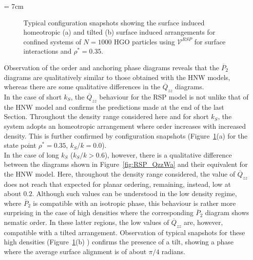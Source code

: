 \picW = 7cm
\begin{figure}
	\centering
	\caption{Typical configuration snapshots showing the surface induced homeotropic (a) and 
	tilted (b)  surface induced arrangements for confined systems of $N=1000$ HGO particles 
	using $\mathcal{V}^{RSP}$ for surface interactions and $\rho^{*} = 0.35$.}
	\label{fig:RSP_snaps}
\end{figure}

Observation of the order and anchoring phase diagrams reveals that the $\overline{P}_2$ diagrams 
are qualitatively
similar to those obtained with the HNW models, whereas there are some  qualitative 
differences in the $\overline{Q}_{zz}$ diagrams.\\
In the case of short $k_S$, the $\overline{Q}_{zz}$ behaviour for the RSP model 
is not unlike that of the HNW model and confirms the predictions made at the end of the  
last Section. Throughout the
density range considered here and for short $k_S$, the system adopts an homeotropic arrangement
where order increases with increased density. This is further confirmed by 
configuration snapshots (\eg Figure~\ref{fig:RSP_snaps}(a) for the state point
$\rho^{*}=0.35$, $k_S/k=0.0$).\\
In the case of long $k_S$ (\ie $k_S/k>0.6$), however, there is a qualitative difference between 
the diagrams shown in  Figure~\ref{fig:RSP_QzzWa} and their equivalent for the HNW model. 
Here, throughout the density range considered, the value of $\overline{Q}_{zz}$ does not reach 
that expected for planar ordering, remaining, instead, low at about $0.2$. Although such
values can be understood in the low density regime, where $\overline{P}_2$ is compatible with
an isotropic phase, this behaviour is rather more surprising in the case of high densities
where the corresponding $\overline{P}_2$ diagram shows nematic order. In these latter regions, 
the low values of
$\overline{Q}_{zz}$ are, however, compatible with a tilted arrangement. 
Observation of typical snapshots for these high densities 
(\eg Figure~\ref{fig:RSP_snaps}(b) ) confirms the presence of a tilt, showing a
phase where the average surface alignment is of about $\pi/4$ radians.\\




